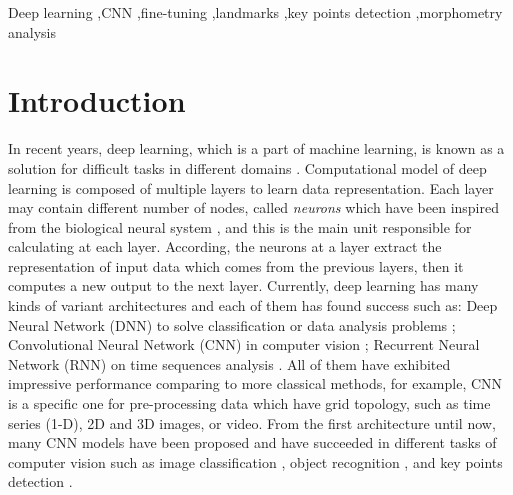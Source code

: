 \documentclass[review]{elsarticle}
\begin{document}
\begin{frontmatter}
\begin{abstract}
\end{abstract}

\begin{keyword}
Deep learning \sep CNN \sep fine-tuning \sep landmarks \sep key points detection \sep morphometry analysis
\end{keyword}

\end{frontmatter}

\linenumbers

\section{Introduction}
\label{sIntroduction}
In recent years, deep learning, which is a part of machine learning, is known as a
solution for difficult tasks in different domains \cite{lecun2015deep}. Computational model of deep
learning is composed of multiple layers to learn data
representation. Each layer may
contain different number of nodes, called \textit{neurons} which have
been inspired from the biological neural system
\cite{arbib2012brains}, and this is the main unit responsible for calculating at each layer. According, the neurons at a layer extract the representation of input data
which comes from the previous layers, then it computes a new
output to the next layer. Currently, deep learning has many kinds of
variant architectures and each of them has found success such as: Deep
Neural Network (DNN) to solve classification or data analysis
problems \cite{hinton2012deep, mikolov2011strategies}; Convolutional
Neural Network (CNN) in computer vision \cite{lecun1998gradient,
  krizhevsky2012imagenet,szegedy2015going}; Recurrent Neural Network
(RNN) on time sequences analysis \cite{lecun2015deep,jean2014using,
  sutskever2014sequence,collobert2011natural}. All of
them have exhibited impressive performance comparing to more classical
methods, for example, CNN is a specific
one for pre-processing data which have grid topology, such as time series (1-D), 2D and 3D images, or video. From the
first architecture \cite{lecun1998gradient} until now, many CNN models
have been proposed and have succeeded in different tasks of computer
vision such as image classification \cite{lecun1998gradient,
  krizhevsky2012imagenet,szegedy2015going}, object recognition
\cite{szegedy2015going,farabet2013learning,li2015convolutional}, and
key points detection \cite{liu2016fashion, sun2013deep,
  zhang2014facial, cintas2016automatic}.
\end{document}
